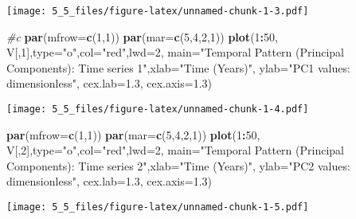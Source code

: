 \documentclass[]{article}
\newenvironment{Shaded}{\begin{snugshade}}{\end{snugshade}}
\newcommand{\KeywordTok}[1]{\textcolor[rgb]{0.13,0.29,0.53}{\textbf{#1}}}
\newcommand{\DataTypeTok}[1]{\textcolor[rgb]{0.13,0.29,0.53}{#1}}
\newcommand{\DecValTok}[1]{\textcolor[rgb]{0.00,0.00,0.81}{#1}}
\newcommand{\FloatTok}[1]{\textcolor[rgb]{0.00,0.00,0.81}{#1}}
\newcommand{\StringTok}[1]{\textcolor[rgb]{0.31,0.60,0.02}{#1}}
\newcommand{\CommentTok}[1]{\textcolor[rgb]{0.56,0.35,0.01}{\textit{#1}}}
\newcommand{\OperatorTok}[1]{\textcolor[rgb]{0.81,0.36,0.00}{\textbf{#1}}}
\newcommand{\NormalTok}[1]{#1}
\begin{document}
\texttt{[image: 5\_5\_files/figure-latex/unnamed-chunk-1-3.pdf]}

\begin{Shaded}
\begin{Highlighting}[]
\CommentTok{#c}
\KeywordTok{par}\NormalTok{(}\DataTypeTok{mfrow=}\KeywordTok{c}\NormalTok{(}\DecValTok{1}\NormalTok{,}\DecValTok{1}\NormalTok{))}
\KeywordTok{par}\NormalTok{(}\DataTypeTok{mar=}\KeywordTok{c}\NormalTok{(}\DecValTok{5}\NormalTok{,}\DecValTok{4}\NormalTok{,}\DecValTok{2}\NormalTok{,}\DecValTok{1}\NormalTok{))}
\KeywordTok{plot}\NormalTok{(}\DecValTok{1}\OperatorTok{:}\DecValTok{50}\NormalTok{, V[,}\DecValTok{1}\NormalTok{],}\DataTypeTok{type=}\StringTok{"o"}\NormalTok{,}\DataTypeTok{col=}\StringTok{"red"}\NormalTok{,}\DataTypeTok{lwd=}\DecValTok{2}\NormalTok{,}
     \DataTypeTok{main=}\StringTok{"Temporal Pattern (Principal Components): Time series 1"}\NormalTok{,}\DataTypeTok{xlab=}\StringTok{"Time (Years)"}\NormalTok{,}
     \DataTypeTok{ylab=}\StringTok{"PC1 values: dimensionless"}\NormalTok{,}
     \DataTypeTok{cex.lab=}\FloatTok{1.3}\NormalTok{, }\DataTypeTok{cex.axis=}\FloatTok{1.3}\NormalTok{)}
\end{Highlighting}
\end{Shaded}

\texttt{[image: 5\_5\_files/figure-latex/unnamed-chunk-1-4.pdf]}

\begin{Shaded}
\begin{Highlighting}[]
\KeywordTok{par}\NormalTok{(}\DataTypeTok{mfrow=}\KeywordTok{c}\NormalTok{(}\DecValTok{1}\NormalTok{,}\DecValTok{1}\NormalTok{))}
\KeywordTok{par}\NormalTok{(}\DataTypeTok{mar=}\KeywordTok{c}\NormalTok{(}\DecValTok{5}\NormalTok{,}\DecValTok{4}\NormalTok{,}\DecValTok{2}\NormalTok{,}\DecValTok{1}\NormalTok{))}
\KeywordTok{plot}\NormalTok{(}\DecValTok{1}\OperatorTok{:}\DecValTok{50}\NormalTok{, V[,}\DecValTok{2}\NormalTok{],}\DataTypeTok{type=}\StringTok{"o"}\NormalTok{,}\DataTypeTok{col=}\StringTok{"red"}\NormalTok{,}\DataTypeTok{lwd=}\DecValTok{2}\NormalTok{,}
     \DataTypeTok{main=}\StringTok{"Temporal Pattern (Principal Components): Time series 2"}\NormalTok{,}\DataTypeTok{xlab=}\StringTok{"Time (Years)"}\NormalTok{,}
     \DataTypeTok{ylab=}\StringTok{"PC2 values: dimensionless"}\NormalTok{,}
     \DataTypeTok{cex.lab=}\FloatTok{1.3}\NormalTok{, }\DataTypeTok{cex.axis=}\FloatTok{1.3}\NormalTok{)}
\end{Highlighting}
\end{Shaded}

\texttt{[image: 5\_5\_files/figure-latex/unnamed-chunk-1-5.pdf]}
\end{document}

